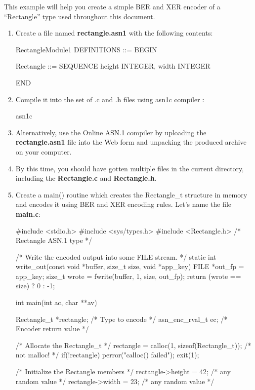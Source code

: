 \documentclass[english,oneside,12pt]{book}
\begin{document}
This example will help you create a simple BER and XER encoder of
a ``Rectangle'' type used throughout this document.
\begin{enumerate}
\item Create a file named \textbf{rectangle.asn1} with the following contents:

\begin{asn}
RectangleModule1 DEFINITIONS ::= BEGIN

Rectangle ::= SEQUENCE {
    height  INTEGER,
    width   INTEGER
}

END
\end{asn}
\item Compile it into the set of .c and .h files using asn1c compiler \cite{ASN1C}:

\begin{bash}
asn1c %
\end{bash}
\item Alternatively, use the Online ASN.1 compiler \cite{AONL} by uploading
the \textbf{rectangle.asn1} file into the Web form and unpacking the
produced archive on your computer.
\item By this time, you should have gotten multiple files in the current
directory, including the \textbf{Rectangle.c} and \textbf{Rectangle.h}.
\item Create a main() routine which creates the Rectangle\_t structure in
memory and encodes it using BER and XER encoding rules. Let's name
the file \textbf{main.c}:

\begin{codesample}[basicstyle=\scriptsize\listingfont]
#include <stdio.h>
#include <sys/types.h>
#include <Rectangle.h>   /* Rectangle ASN.1 type  */

/* Write the encoded output into some FILE stream. */
static int write_out(const void *buffer, size_t size, void *app_key) {
    FILE *out_fp = app_key;
    size_t wrote = fwrite(buffer, 1, size, out_fp);
    return (wrote == size) ? 0 : -1;
}
 
int main(int ac, char **av) {
    Rectangle_t *rectangle; /* Type to encode        */
    asn_enc_rval_t ec;      /* Encoder return value  */

    /* Allocate the Rectangle_t */
    rectangle = calloc(1, sizeof(Rectangle_t)); /* not malloc! */
    if(!rectangle) {
        perror("calloc() failed");
        exit(1);
    }

    /* Initialize the Rectangle members */
    rectangle->height = 42;  /* any random value */
    rectangle->width  = 23;  /* any random value */

}
\end{codesample}
\end{enumerate}
\end{document}
